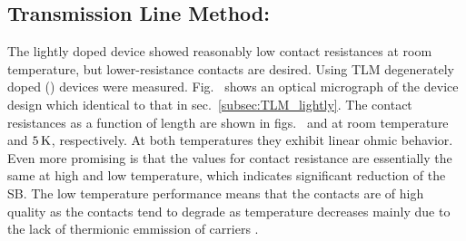 \subsection{Transmission Line Method: \degenerate}\label{subsec:TLM_degenerate}
The lightly doped  device showed reasonably low contact resistances at room temperature, but lower-resistance contacts are desired. Using \acs{TLM} degenerately doped  (\degenerate) devices were measured. Fig.~ shows an optical micrograph of the device design which identical to that in sec.~\ref{subsec:TLM_lightly}. The contact resistances as a function of length are shown in figs.~ and  at room temperature and $5\,\mathrm{K}$, respectively. At both temperatures they exhibit linear ohmic behavior. Even more promising is that the values for contact resistance are essentially the same at high and low temperature, which indicates significant reduction of the \acs{SB}. The low temperature performance means that the contacts are of high quality as the contacts tend to degrade as temperature decreases mainly due to the lack of thermionic emmission of carriers \cite{Tung_AppPhysRev2014}. 
